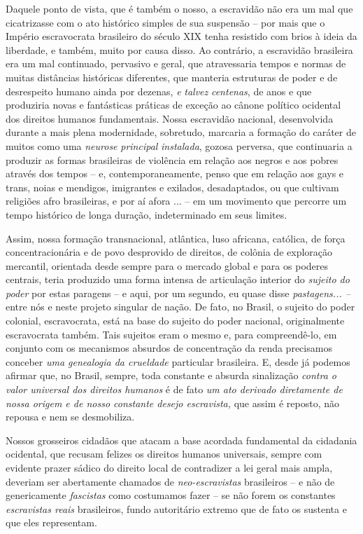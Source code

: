 Daquele ponto de vista, que é também o nosso, a escravidão não era um
mal que cicatrizasse com o ato histórico simples de sua suspensão -- por
mais que o Império escravocrata brasileiro do século XIX tenha resistido
com brios à ideia da liberdade, e também, muito por causa disso. Ao
contrário, a escravidão brasileira era um mal continuado, pervasivo e
geral, que atravessaria tempos e normas de muitas distâncias históricas
diferentes, que manteria estruturas de poder e de desrespeito humano
ainda por dezenas, \emph{e} \emph{talvez} \emph{centenas}, de anos e que
produziria novas e fantásticas práticas de exceção ao cânone político
ocidental dos direitos humanos fundamentais. Nossa escravidão nacional,
desenvolvida durante a mais plena modernidade, sobretudo, marcaria a
formação do caráter de muitos como uma \emph{neurose} \emph{principal}
\emph{instalada}, gozosa perversa, que continuaria a produzir as formas
brasileiras de violência em relação aos negros e aos pobres através dos
tempos -- e, contemporaneamente, penso que em relação aos gays e trans,
noias e mendigos, imigrantes e exilados, desadaptados, ou que cultivam
religiões afro brasileiras, e por aí afora ... -- em um movimento que
percorre um tempo histórico de longa duração, indeterminado em seus
limites.

Assim, nossa formação transnacional, atlântica, luso africana, católica,
de força concentracionária e de povo desprovido de direitos, de colônia
de exploração mercantil, orientada desde sempre para o mercado global e
para os poderes centrais, teria produzido uma forma intensa de
articulação interior do \emph{sujeito do poder} por estas paragens -- e
aqui, por um segundo, eu quase disse \emph{pastagens... --} entre nós e
neste projeto singular de nação. De fato, no Brasil, o sujeito do poder
colonial, escravocrata, está na base do sujeito do poder nacional,
originalmente escravocrata também. Tais sujeitos eram o mesmo e, para
compreendê-lo, em conjunto com os mecanismos absurdos de concentração da
renda precisamos conceber \emph{uma genealogia da crueldade} particular
brasileira. E, desde já podemos afirmar que, no Brasil, sempre, toda
constante e absurda sinalização \emph{contra o valor universal dos
direitos humanos} é de fato \emph{um ato derivado diretamente de nossa
origem e de nosso constante desejo escravista,} que assim é reposto, não
repousa e nem se desmobiliza.

Nossos grosseiros cidadãos que atacam a base acordada fundamental da
cidadania ocidental, que recusam felizes os direitos humanos universais,
sempre com evidente prazer sádico do direito local de contradizer a lei
geral mais ampla, deveriam ser abertamente chamados de
\emph{neo-escravistas} brasileiros -- e não de genericamente
\emph{fascistas} como costumamos fazer -- se não forem os constantes
\emph{escravistas reais} brasileiros, fundo autoritário extremo que de
fato os sustenta e que eles representam.

